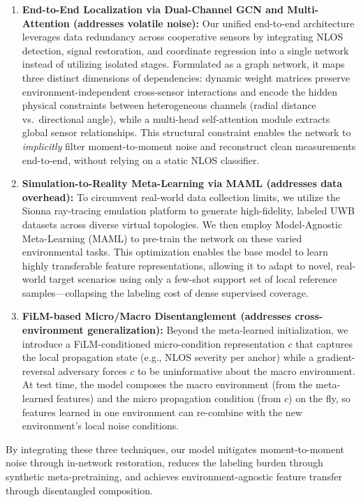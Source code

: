 \documentclass[11pt]{article}
\begin{document}
\begin{enumerate}
  \item \textbf{End-to-End Localization via Dual-Channel GCN and Multi-Attention (addresses volatile noise):} Our unified end-to-end architecture leverages data redundancy across cooperative sensors by integrating NLOS detection, signal restoration, and coordinate regression into a single network instead of utilizing isolated stages. Formulated as a graph network, it maps three distinct dimensions of dependencies: dynamic weight matrices preserve environment-independent cross-sensor interactions and encode the hidden physical constraints between heterogeneous channels (radial distance vs.\ directional angle), while a multi-head self-attention module extracts global sensor relationships. This structural constraint enables the network to \emph{implicitly} filter moment-to-moment noise and reconstruct clean measurements end-to-end, without relying on a static NLOS classifier.

  \item \textbf{Simulation-to-Reality Meta-Learning via MAML (addresses data overhead):} To circumvent real-world data collection limits, we utilize the Sionna ray-tracing emulation platform to generate high-fidelity, labeled UWB datasets across diverse virtual topologies. We then employ Model-Agnostic Meta-Learning (MAML) to pre-train the network on these varied environmental tasks. This optimization enables the base model to learn highly transferable feature representations, allowing it to adapt to novel, real-world target scenarios using only a few-shot support set of local reference samples---collapsing the labeling cost of dense supervised coverage.

  \item \textbf{FiLM-based Micro/Macro Disentanglement (addresses cross-environment generalization):} Beyond the meta-learned initialization, we introduce a FiLM-conditioned micro-condition representation $c$ that captures the local propagation state (e.g., NLOS severity per anchor) while a gradient-reversal adversary forces $c$ to be uninformative about the macro environment. At test time, the model composes the macro environment (from the meta-learned features) and the micro propagation condition (from $c$) on the fly, so features learned in one environment can re-combine with the new environment's local noise conditions.
\end{enumerate}

\noindent By integrating these three techniques, our model mitigates moment-to-moment noise through in-network restoration, reduces the labeling burden through synthetic meta-pretraining, and achieves environment-agnostic feature transfer through disentangled composition.
\end{document}
